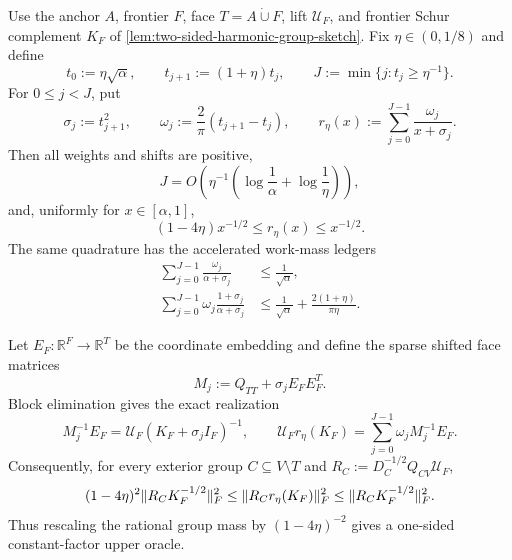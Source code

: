 \begin{theorem}
\label{thm:positive-resolvent-frontier-ladder}
Use the anchor $A$, frontier $F$, face
$T=A\mathbin{\dot\cup}F$, lift $\mathcal U_F$, and frontier Schur
complement $K_F$ of
\cref{lem:two-sided-harmonic-group-sketch}.  Fix
$\eta\in(0,1/8)$ and define
\begin{equation*}
 t_0:=\eta\sqrt\alpha,
 \qquad
 t_{j+1}:=(1+\eta)t_j,
 \qquad
 J:=\min\{j:t_j\geq\eta^{-1}\}.
\end{equation*}
For $0\leq j<J$, put
\begin{equation}
 \sigma_j:=t_{j+1}^2,
 \qquad
 \omega_j:=\frac2\pi(t_{j+1}-t_j),
 \qquad
 r_\eta(x):=\sum_{j=0}^{J-1}\frac{\omega_j}{x+\sigma_j}.
 \label{eq:positive-resolvent-ladder}
\end{equation}
Then all weights and shifts are positive,
\begin{equation}
 J=O\!\left(
  \eta^{-1}\left(\log\frac1\alpha+\log\frac1\eta\right)
 \right),
 \label{eq:positive-resolvent-rung-count}
\end{equation}
and, uniformly for $x\in[\alpha,1]$,
\begin{equation}
 (1-4\eta)x^{-1/2}
 \leq r_\eta(x)\leq x^{-1/2}.
 \label{eq:positive-resolvent-spectral-sandwich}
\end{equation}
The same quadrature has the accelerated work-mass ledgers
\begin{align}
 \sum_{j=0}^{J-1}\frac{\omega_j}{\alpha+\sigma_j}
 &\leq\frac1{\sqrt\alpha},
 \label{eq:positive-resolvent-work-mass}\\
 \sum_{j=0}^{J-1}
  \omega_j\frac{1+\sigma_j}{\alpha+\sigma_j}
 &\leq\frac1{\sqrt\alpha}
   +\frac{2(1+\eta)}{\pi\eta}.
 \label{eq:positive-resolvent-coordinate-mass}
\end{align}

Let $E_F:\mathbb R^F\to\mathbb R^T$ be the coordinate embedding and
define the sparse shifted face matrices
\begin{equation}
 M_j:=Q_{TT}+\sigma_jE_FE_F^T.
 \label{eq:shifted-face-matrix}
\end{equation}
Block elimination gives the exact realization
\begin{equation}
 M_j^{-1}E_F
 =\mathcal U_F(K_F+\sigma_jI_F)^{-1},
 \qquad
 \mathcal U_Fr_\eta(K_F)
 =\sum_{j=0}^{J-1}\omega_jM_j^{-1}E_F.
 \label{eq:positive-resolvent-block-realization}
\end{equation}
Consequently, for every exterior group $C\subseteq V\setminus T$ and
$R_C:=D_C^{-1/2}Q_{CV}\mathcal U_F$,
\begin{equation}
 (1-4\eta)^2\lVert R_CK_F^{-1/2}\rVert_F^2
 \leq\lVert R_Cr_\eta(K_F)\rVert_F^2
 \leq\lVert R_CK_F^{-1/2}\rVert_F^2.
 \label{eq:positive-resolvent-group-sandwich}
\end{equation}
Thus rescaling the rational group mass by $(1-4\eta)^{-2}$ gives a
one-sided constant-factor upper oracle.


\end{theorem}
